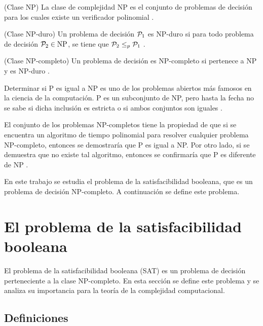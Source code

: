 \begin{definition}{(Clase NP)}
	La clase de complejidad NP es el conjunto de problemas de decisión para los cuales existe un verificador polinomial \cite{Cormen2009IntroductionTA}.
\end{definition}

\begin{definition}({Clase NP-duro})
	Un problema de decisión $\mathcal{P}_1$ es NP-duro si para todo problema de decisión $\mathcal{P}_2 \in \text{NP}$, se tiene que $\mathcal{P}_2 \leq_p \mathcal{P}_1$ \cite{Cormen2009IntroductionTA}.
\end{definition}

\begin{definition}({Clase NP-completo})
	Un problema de decisión es NP-completo si pertenece a NP y es NP-duro \cite{Cormen2009IntroductionTA}.
\end{definition}


Determinar si P es igual a NP es uno de los problemas abiertos más famosos en la ciencia de la computación. P es un subconjunto de NP, pero hasta la fecha no se sabe si dicha inclusión es estricta o si ambos conjuntos son iguales \cite{automataTheory}.

El conjunto de los problemas NP-completos tiene la propiedad de que si se encuentra un algoritmo de tiempo polinomial para resolver cualquier problema NP-completo, entonces se demostraría que P es igual a NP. Por otro lado, si se demuestra que no existe tal algoritmo, entonces se confirmaría que P es diferente de NP \cite{automataTheory}.

En este trabajo se estudia el problema de la satisfacibilidad booleana, que es un problema de decisión NP-completo. A continuación se define este problema.


\section{El problema de la satisfacibilidad booleana}
\label{sec:sat}

El problema de la satisfacibilidad booleana (SAT) es un problema de decisión perteneciente a la clase NP-completo. En esta sección se define este problema y se analiza su importancia para la teoría de la complejidad computacional.

\subsection{Definiciones}

